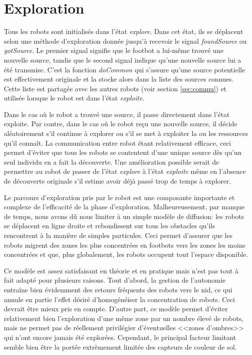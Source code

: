 \section{Exploration\label{sec:explore}}

Tous les robots sont initialisés dans l'état \emph{explore}. Dans cet état, ils se déplacent selon une méthode d'exploration donnée jusqu'à recevoir le signal \emph{foundSource} ou \emph{gotSource}. Le premier signal signifie que le footbot a lui-même trouvé une nouvelle source, tandis que le second signal indique qu'une nouvelle source lui a été transmise. C'est la fonction \emph{doCommon} qui s'assure qu'une source potentielle est effectivement originale et la stocke alors dans la liste des sources connues. Cette liste est partagée avec les autres robots (voir section \ref{sec:commu}) et utilisée lorsque le robot est dans l'état \emph{exploite}.

Dans le cas où le robot a trouvé une source, il passe directement dans l'état exploite. Par contre, dans le cas où le robot reçu une nouvelle source, il décide aléatoirement s'il continue à explorer ou s'il se met à exploiter la ou les ressources qu'il connaît. La communication entre robot étant relativement efficace, ceci permet d'éviter que tous les robots se contentent d'une unique source dès qu'un seul individu en a fait la découverte. Une amélioration possible serait de permettre au robot de passer de l'état \emph{explore} à l'état \emph{exploite} même en l'absence de découverte originale s'il estime avoir déjà passé trop de temps à explorer.

Le parcours d'exploration pris par le robot est une composante importante et complexe de l'efficacité de la phase d'exploration. Malheureusement, par manque de temps, nous avons dû nous limiter à un simple modèle de diffusion: les robots se déplacent en ligne droite et rebondissent sur tous les obstacles qu'ils rencontrent à la manière de simples particules. Ceci permet d'assurer que les robots migrent des zones les plus concentrées en footbots vers les zones les moins concentrées et que, plus globalement, les robots occupent tout l'espace disponible.

Ce modèle est assez satisfaisant en théorie et en pratique mais n'est pas tout à fait adapté pour plusieurs raisons. Tout d'abord, la gestion de l'autonomie entraîne bien évidemment des retours fréquents des robots vers le nid, ce qui annule en partie l'effet désiré d'homogénéiser la concentration de robots. Ceci devrait être mieux pris en compte. D'autre part, ce modèle permet d'éviter relativement bien l'exploration d'une même zone par un nombre élevé de robots, mais ne permet pas de réellement privilégier d'éventuelles <<zones d'ombres>> qui n'ont encore jamais été explorées. Cependant, le principal facteur limitant semble bien être la portée extrèmement limitée des capteurs de couleur de sol.

